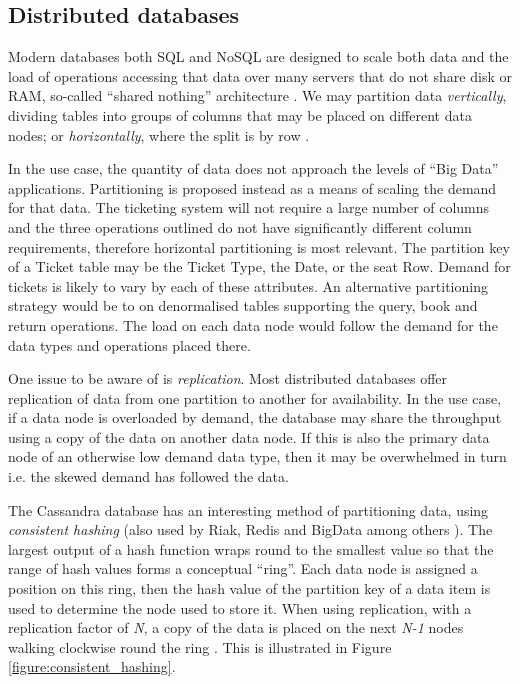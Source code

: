 %
%
\FloatBarrier
\subsection{Distributed databases}\label{sec:distributed-databases}
Modern databases both SQL and NoSQL are designed to scale both data and the load of operations accessing that data over many servers that do not share disk or RAM, so-called ``shared nothing'' architecture \cite{RN67}.  We may partition data {\itshape vertically}, dividing tables into groups of columns that may be placed on different data nodes; or {\itshape horizontally}, where the split is by row \cite{RN68}. 

In the use case, the quantity of data does not approach the levels of ``Big Data'' applications.  Partitioning is proposed instead as a means of scaling the demand for that data.  The ticketing system will not require a large number of columns and the three operations outlined do not have significantly different column requirements, therefore horizontal partitioning is most relevant.  The partition key of a Ticket table may be the Ticket Type, the Date, or the seat Row.  Demand for tickets is likely to vary by each of these attributes.  An alternative partitioning strategy would be to on denormalised tables supporting the query, book and return operations.  The load on each data node would follow the demand for the data types and operations placed there.

One issue to be aware of is {\itshape replication}.   Most distributed databases offer replication of data from one partition to another for availability.  In the use case, if a data node is overloaded by demand, the database may share the throughput using a copy of the data on another data node.  If this is also the primary data node of an otherwise low demand data type, then it may be overwhelmed in turn i.e. the skewed demand has followed the data.

The Cassandra database has an interesting method of partitioning data, using {\itshape consistent hashing} (also used by Riak, Redis and BigData among others \cite{RN66}).  The largest output of a hash function wraps round to the smallest value so that the range of hash values forms a conceptual ``ring''.  Each data node is assigned a position on this ring, then the hash value of the partition key of a data item is used to determine the node used to store it.  When using replication, with a replication factor of {\itshape N}, a copy of the data is placed on the next {\itshape N-1} nodes walking clockwise round the ring \cite{RN1050}.  This is illustrated in Figure \ref{figure:consistent_hashing}.

